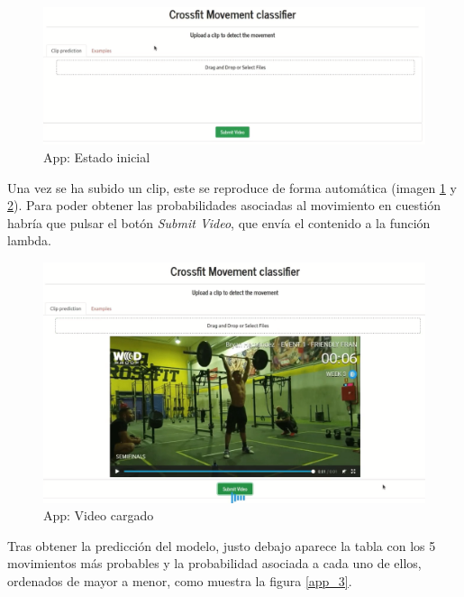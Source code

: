 \begin{figure}[H]
    \centering
		\includegraphics[width=\textwidth]{figs/app_1.png}
\caption{App: Estado inicial}\label{app_1}
\end{figure}

Una vez se ha subido un clip, este se reproduce de forma automática (imagen \ref{app_1} y \ref{app_2}). Para poder obtener las probabilidades asociadas al movimiento en cuestión habría que pulsar el botón \textit{Submit Video}, que envía el contenido a la función lambda.

\begin{figure}[H]
    \centering
		\includegraphics[width=\textwidth]{figs/app_2.png}
\caption{App: Video cargado}\label{app_2}
\end{figure}

Tras obtener la predicción del modelo, justo debajo aparece la tabla con los 5 movimientos más probables y la probabilidad asociada a cada uno de ellos, ordenados de mayor a menor, como muestra la figura \ref{app_3}.

